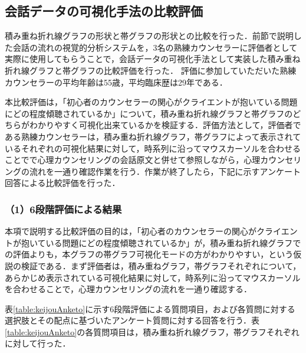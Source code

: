 \documentclass[shuuron]{kuee}
\begin{document}







\subsection{会話データの可視化手法の比較評価}
積み重ね折れ線グラフの形状と帯グラフの形状との比較を行った．前節で説明した会話の流れの視覚的分析システムを，3名の熟練カウンセラーに評価者として実際に使用してもらうことで，会話データの可視化手法として実装した積み重ね折れ線グラフと帯グラフの比較評価を行った．
評価に参加していただいた熟練カウンセラーの平均年齢は55歳，平均臨床歴は29年である．

本比較評価は，「初心者のカウンセラーの関心がクライエントが抱いている問題にどの程度傾聴されているか」について，積み重ね折れ線グラフと帯グラフのどちらがわかりやすく可視化出来ているかを検証する．評価方法として，評価者である熟練カウンセラーは，積み重ね折れ線グラフ，帯グラフによって表示されているそれぞれの可視化結果に対して，時系列に沿ってマウスカーソルを合わせることでで心理カウンセリングの会話原文と併せて参照しながら，心理カウンセリングの流れを一通り確認作業を行う．作業が終了したら，下記に示すアンケート回答による比較評価を行った．

\subsubsection{（1）6段階評価による結果}

本項で説明する比較評価の目的は，「初心者のカウンセラーの関心がクライエントが抱いている問題にどの程度傾聴されているか」が，積み重ね折れ線グラフでの評価よりも，本グラフの帯グラフ可視化モードの方がわかりやすい，という仮説の検証である．まず評価者は，積み重ねグラフ，帯グラフそれぞれについて，あらかじめ表示されている可視化結果に対して，時系列に沿ってマウスカーソルを合わせることで，心理カウンセリングの流れを一通り確認する．

表\ref{table:keijouAnketo}に示す6段階評価による質問項目，および各質問に対する選択肢とその配点に基づいたアンケート質問に対する回答を行う．表\ref{table:keijouAnketo}の各質問項目は，積み重ね折れ線グラフ，帯グラフそれぞれに対して行った．

\end{document}
